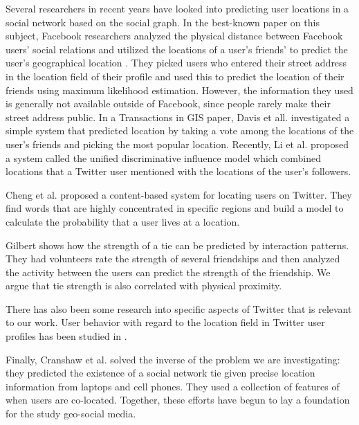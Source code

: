 Several researchers in recent years have looked into predicting user locations
in a social network based on the social graph.
%
In the best-known paper on this subject, Facebook researchers analyzed
the physical distance between Facebook users' social relations and utilized the
locations of a user's friends' to predict the user's geographical location
\cite{backstrom2010find}.
%
They picked users who entered their street address in the location field of
their profile and used this to predict the location of their friends using
maximum likelihood estimation.
%
However, the information they used is generally not available outside of
Facebook, since people rarely make their street address public.
%
In a Transactions in GIS paper, Davis et all. \cite{davis2011infer}
investigated a simple system that predicted location by taking a vote among
the locations of the user's friends and picking the most popular location.
%
Recently, Li et al. \cite{li2012towards} proposed a system called the unified
discriminative influence model which combined locations that a Twitter user
mentioned with the locations of the user's followers.


Cheng et al. \cite{cheng2010you} proposed a
content-based system for locating users on Twitter. They find words that are
highly concentrated in specific regions and build a model to calculate the
probability that a user lives at a location.

Gilbert \cite{gilbert2009predicting} shows how the strength of a tie can be
predicted by interaction patterns.  They had volunteers rate the strength of
several friendships and then analyzed the activity between the users can
predict the strength of the friendship.  We argue that tie strength is also
correlated with physical proximity.

There has also been some research into specific aspects of Twitter that is
relevant to our work.  User behavior with regard to the location field in
Twitter user profiles has been studied in \cite{hecht2011tweets}.


Finally, Cranshaw et al. \cite{cranshaw2010bridging} solved the inverse of the
problem we are investigating: they predicted the existence of a social network
tie given precise location information from laptops and cell phones. They used
a collection of features of when users are co-located.  Together, these efforts
have begun to lay a foundation for the study geo-social media.

